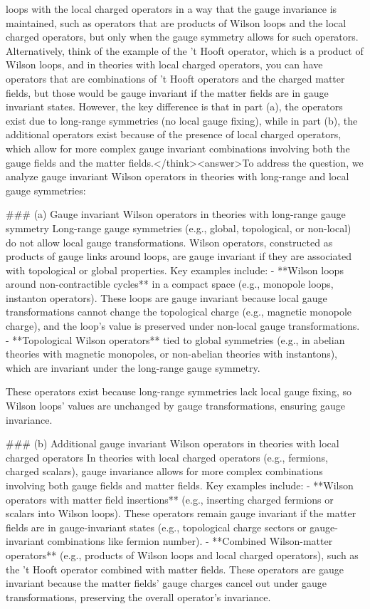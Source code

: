 loops with the local charged operators in a way that the gauge invariance is maintained, such as operators that are products of Wilson loops and the local charged operators, but only when the gauge symmetry allows for such operators. Alternatively, think of the example of the 't Hooft operator, which is a product of Wilson loops, and in theories with local charged operators, you can have operators that are combinations of 't Hooft operators and the charged matter fields, but those would be gauge invariant if the matter fields are in gauge invariant states. However, the key difference is that in part (a), the operators exist due to long-range symmetries (no local gauge fixing), while in part (b), the additional operators exist because of the presence of local charged operators, which allow for more complex gauge invariant combinations involving both the gauge fields and the matter fields.</think><answer>To address the question, we analyze gauge invariant Wilson operators in theories with long-range and local gauge symmetries:  


### (a) Gauge invariant Wilson operators in theories with long-range gauge symmetry  
Long-range gauge symmetries (e.g., global, topological, or non-local) do not allow local gauge transformations. Wilson operators, constructed as products of gauge links around loops, are gauge invariant if they are associated with topological or global properties. Key examples include:  
- **Wilson loops around non-contractible cycles** in a compact space (e.g., monopole loops, instanton operators). These loops are gauge invariant because local gauge transformations cannot change the topological charge (e.g., magnetic monopole charge), and the loop’s value is preserved under non-local gauge transformations.  
- **Topological Wilson operators** tied to global symmetries (e.g., in abelian theories with magnetic monopoles, or non-abelian theories with instantons), which are invariant under the long-range gauge symmetry.  

These operators exist because long-range symmetries lack local gauge fixing, so Wilson loops’ values are unchanged by gauge transformations, ensuring gauge invariance.  

### (b) Additional gauge invariant Wilson operators in theories with local charged operators  
In theories with local charged operators (e.g., fermions, charged scalars), gauge invariance allows for more complex combinations involving both gauge fields and matter fields. Key examples include:  
- **Wilson operators with matter field insertions** (e.g., inserting charged fermions or scalars into Wilson loops). These operators remain gauge invariant if the matter fields are in gauge-invariant states (e.g., topological charge sectors or gauge-invariant combinations like fermion number).  
- **Combined Wilson-matter operators** (e.g., products of Wilson loops and local charged operators), such as the 't Hooft operator combined with matter fields. These operators are gauge invariant because the matter fields’ gauge charges cancel out under gauge transformations, preserving the overall operator’s invariance.  

